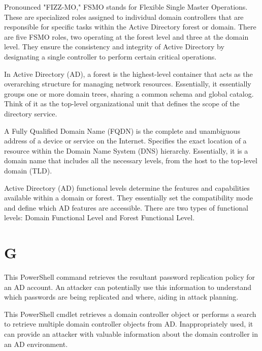  Pronounced "FIZZ-MO," FSMO stands for Flexible Single Master Operations. These are specialized roles assigned to individual domain controllers that are responsible for specific tasks within the Active Directory forest or domain. There are five FSMO roles, two operating at the forest level and three at the domain level. They ensure the consistency and integrity of Active Directory by designating a single controller to perform certain critical operations. 

 In Active Directory (AD), a forest is the highest-level container that acts as the overarching structure for managing network resources. Essentially, it essentially groups one or more domain trees, sharing a common schema and global catalog. Think of it as the top-level organizational unit that defines the scope of the directory service.

 A Fully Qualified Domain Name (FQDN) is the complete and unambiguous address of a device or service on the Internet. Specifies the exact location of a resource within the Domain Name System (DNS) hierarchy. Essentially, it is a domain name that includes all the necessary levels, from the host to the top-level domain (TLD). 

 Active Directory (AD) functional levels determine the features and capabilities available within a domain or forest. They essentially set the compatibility mode and define which AD features are accessible. There are two types of functional levels: Domain Functional Level and Forest Functional Level. 

\section*{G}
 This PowerShell command retrieves the resultant password replication policy for an AD account. An attacker can potentially use this information to understand which passwords are being replicated and where, aiding in attack planning.

 This PowerShell cmdlet retrieves a domain controller object or performs a search to retrieve multiple domain controller objects from AD. Inappropriately used, it can provide an attacker with valuable information about the domain controller in an AD environment.


